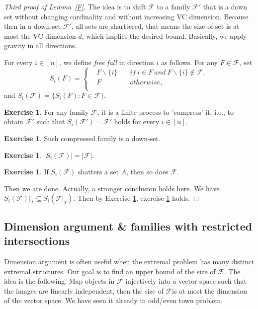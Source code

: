 \documentclass{article}
\theoremstyle{definition}
\newtheorem{exercise}[theorem]{Exercise}
\begin{document}
\begin{proof}[Third proof of Lemma~\ref{F}]

The idea is to shift $\mathcal{F}$ to a family $\mathcal{F'}$ that is a down set without changing cardinality and without increasing VC dimension. Because then in a down-set $\mathcal{F'}$, all sets are sharttered, that means the size of set is at most the VC dimension $d$, which implies the desired bound. Basically, we apply gravity in all directions.

For every $i\in [n]$, we define \emph{free fall} in direction $i$ as follows. For any $F\in \mathcal{F}$, set
$$S_i(F)=\left\{
    	\begin{aligned}
    	&F\backslash\{i\} \quad &if\ i\in F\ and\ F\backslash \{i\}\notin \mathcal{F},\\
    	&F \quad &otherwise,\\
    	\end{aligned}
    	\right
    	.
        $$
and $S_i(\mathcal{F})=\{S_i(F):F\in \mathcal{F}\}$.
 \begin{exercise}
    For any family $\mathcal{F}$, it is a finite process to 'compress' it, i.e., to obtain $\mathcal{F'}$ such that $S_i(\mathcal{F'})=\mathcal{F'}$ holds for every $i\in [n]$.
\end{exercise}
 \begin{exercise}
    Such compressed family is a down-set.
\end{exercise}
 \begin{exercise}\label{ex20-1}
    $|S_i(\mathcal{F})|=|\mathcal{F}|$.
\end{exercise}
 \begin{exercise}\label{ex20-2}
    If $S_i(\mathcal{F})$ shatters a set $A$, then so does $\mathcal{F}$.
\end{exercise}
Then we are done. Actually, a stronger conclusion holds here. We have $S_i(\mathcal{F})|_T\subseteq S_i(\mathcal{F}|_T)$. Then by Exercise \ref{ex20-1}, exercise \ref{ex20-2} holds.
\end{proof}

\subsection{Dimension argument \& families with restricted intersections}

Dimension argument is often useful when the extremal problem has many distinct extremal structures. Our goal is to find an upper bound of the size of $\mathcal{F}$. The idea is the following. Map objects in $\mathcal{F}$ injectively into a vector space such that the images are linearly independent, then the size of $\mathcal{F}$is at most the dimension of the vector space. We have seen it already in odd/even town problem.
\end{document}
